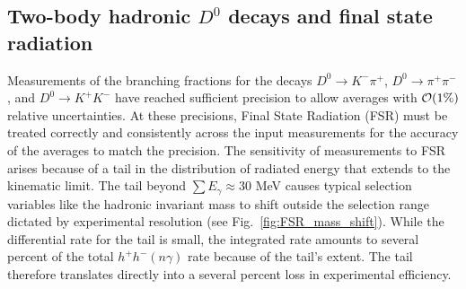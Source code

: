 \subsection{Two-body hadronic $D^0$ decays and final state radiation}

Measurements of the branching fractions for the decays $D^0\to K^-\pi^+$,
$D^0\to \pi^+\pi^-$, and $D^0\to K^+ K^-$ have reached sufficient precision to
allow averages with ${\cal O}(1\%)$ relative uncertainties. 
At these precisions, Final 
State Radiation (FSR) must be treated correctly and consistently across 
the input measurements for the accuracy of the averages to match the 
precision.  The sensitivity of measurements to FSR arises because of 
a tail in the distribution of radiated energy that extends to the 
kinematic limit.  The tail beyond $\sum{E_\gamma} \approx 30$ MeV causes 
typical selection variables like the hadronic invariant mass to 
shift outside the selection range dictated by experimental 
resolution (see Fig.~\ref{fig:FSR_mass_shift}).  While the 
differential rate for the tail is small, the integrated rate 
amounts to several percent of the total $h^+ h^-(n\gamma)$ 
rate because of the tail's extent.  The tail therefore 
translates directly into a several percent loss in 
experimental efficiency.

